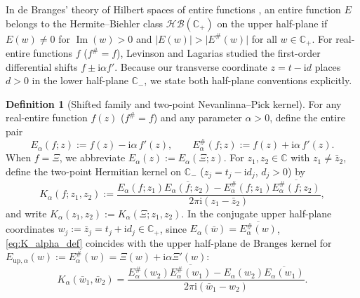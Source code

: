 \documentclass[11pt,reqno]{amsart}
\theoremstyle{definition}
\newtheorem{definition}[theorem]{Definition}
\theoremstyle{remark}
\numberwithin{equation}{section}
\newcommand{\ii}{\mathrm{i}}
\newcommand{\Ima}{\operatorname{Im}}
\begin{document}
In de Branges' theory of Hilbert spaces of entire functions \cite[Ch.~2]{deBranges1968}, an entire function $E$ belongs to the Hermite--Biehler class $\mathcal{HB}(\mathbb{C}_+)$ on the upper half-plane if $E(w) \neq 0$ for $\Ima(w) > 0$ and $\lvert E(w)\rvert > \lvert E^\#(w)\rvert$ for all $w \in \mathbb{C}_+$. For real-entire functions $f$ ($f^\# = f$), Levinson \cite{Levinson1974} and Lagarias \cite{Lagarias2005,Lagarias2006} studied the first-order differential shifts $f \pm \ii\alpha f'$. Because our transverse coordinate $z = t - \ii d$ places $d > 0$ in the lower half-plane $\mathbb{C}_-$, we state both half-plane conventions explicitly.

\begin{definition}[Shifted family and two-point Nevanlinna--Pick kernel]\label{def:debranges_family}
For any real-entire function $f(z)$ ($f^\# = f$) and any parameter $\alpha > 0$, define the entire pair
\begin{equation}\label{eq:E_alpha_def}
  E_\alpha(f; z) := f(z) - \ii\alpha\,f'(z), \qquad
  E_\alpha^\#(f; z) := f(z) + \ii\alpha\,f'(z).
\end{equation}
When $f = \Xi$, we abbreviate $E_\alpha(z) := E_\alpha(\Xi; z)$. For $z_1, z_2 \in \mathbb{C}$ with $z_1 \neq \bar{z}_2$, define the two-point Hermitian kernel on $\mathbb{C}_-$ ($z_j = t_j - \ii d_j$, $d_j > 0$) by
\begin{equation}\label{eq:K_alpha_def}
  K_\alpha(f; z_1, z_2) := \frac{E_\alpha(f; z_1)\overline{E_\alpha(f; z_2)} - E_\alpha^\#(f; z_1)\overline{E_\alpha^\#(f; z_2)}}{2\pi\ii(z_1 - \bar{z}_2)},
\end{equation}
and write $K_\alpha(z_1,z_2) := K_\alpha(\Xi; z_1,z_2)$. In the conjugate upper half-plane coordinates $w_j := \bar{z}_j = t_j + \ii d_j \in \mathbb{C}_+$, since $E_\alpha(\bar{w}) = \overline{E_\alpha^\#(w)}$, \eqref{eq:K_alpha_def} coincides with the upper half-plane de Branges kernel \cite[p.~50]{deBranges1968} for $E_{\mathrm{up},\alpha}(w) := E_\alpha^\#(w) = \Xi(w) + \ii\alpha\Xi'(w)$:
\begin{equation}\label{eq:K_alpha_upper}
  K_\alpha(\bar{w}_1, \bar{w}_2) = \frac{E_\alpha^\#(w_2)\overline{E_\alpha^\#(w_1)} - E_\alpha(w_2)\overline{E_\alpha(w_1)}}{2\pi\ii(\bar{w}_1 - w_2)}.
\end{equation}
\end{definition}
\end{document}
